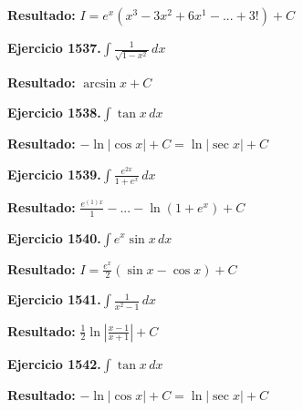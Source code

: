 \documentclass[10pt,a4paper]{article}
\begin{document}
\begin{solbox}
\textbf{Resultado:} \(\displaystyle I = e^x(x^{3} - 3x^{2} + 6x^{1} - ... + 3!) + C\)
\end{solbox}

\newpage
\begin{ejbox}
\textbf{Ejercicio 1537.}\quad $\int \frac{1}{\sqrt{1-x^2}}\,dx$
\end{ejbox}

\begin{solbox}
\textbf{Resultado:} \(\displaystyle \arcsin x + C\)
\end{solbox}

\begin{ejbox}
\textbf{Ejercicio 1538.}\quad $\int \tan x\,dx$
\end{ejbox}

\begin{solbox}
\textbf{Resultado:} \(\displaystyle -\ln|\cos x| + C = \ln|\sec x| + C\)
\end{solbox}

\begin{ejbox}
\textbf{Ejercicio 1539.}\quad $\int \frac{e^{2x}}{1+e^{x}}\,dx$
\end{ejbox}

\begin{solbox}
\textbf{Resultado:} \(\displaystyle \frac{e^{(1)x}}{1} - ... - \ln(1+e^x) + C\)
\end{solbox}

\newpage
\begin{ejbox}
\textbf{Ejercicio 1540.}\quad $\int e^x\sin x\,dx$
\end{ejbox}

\begin{solbox}
\textbf{Resultado:} \(\displaystyle I = \frac{e^x}{2}(\sin x - \cos x) + C\)
\end{solbox}

\begin{ejbox}
\textbf{Ejercicio 1541.}\quad $\int \frac{1}{x^2-1}\,dx$
\end{ejbox}

\begin{solbox}
\textbf{Resultado:} \(\displaystyle \frac{1}{2}\ln\left|\frac{x-1}{x+1}\right| + C\)
\end{solbox}

\begin{ejbox}
\textbf{Ejercicio 1542.}\quad $\int \tan x\,dx$
\end{ejbox}

\begin{solbox}
\textbf{Resultado:} \(\displaystyle -\ln|\cos x| + C = \ln|\sec x| + C\)
\end{solbox}
\end{document}
